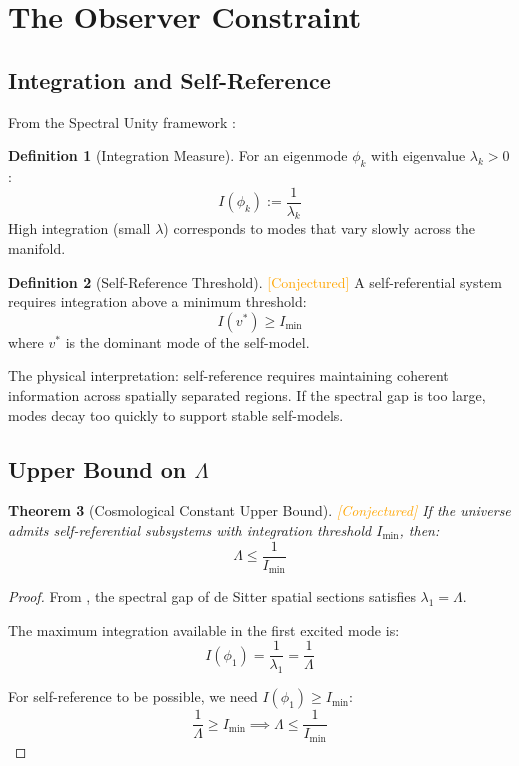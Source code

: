 \documentclass[11pt,a4paper]{article}
\theoremstyle{plain}
\newtheorem{theorem}{Theorem}[section]
\theoremstyle{definition}
\newtheorem{definition}[theorem]{Definition}
\theoremstyle{remark}
\newcommand{\conjectured}{\textcolor{orange}{[Conjectured]}}
\begin{document}
\section{The Observer Constraint}

\subsection{Integration and Self-Reference}

From the Spectral Unity framework \cite{spectral_unity}:

\begin{definition}[Integration Measure]
For an eigenmode $\phi_k$ with eigenvalue $\lambda_k > 0$:
\[
I(\phi_k) := \frac{1}{\lambda_k}
\]
High integration (small $\lambda$) corresponds to modes that vary slowly across the manifold.
\end{definition}

\begin{definition}[Self-Reference Threshold] \conjectured
\label{def:threshold}
A self-referential system requires integration above a minimum threshold:
\[
I(v^*) \geq I_{\min}
\]
where $v^*$ is the dominant mode of the self-model.
\end{definition}

The physical interpretation: self-reference requires maintaining coherent information across spatially separated regions. If the spectral gap is too large, modes decay too quickly to support stable self-models.

\subsection{Upper Bound on $\Lambda$}

\begin{theorem}[Cosmological Constant Upper Bound] \conjectured
\label{thm:upper_bound}
If the universe admits self-referential subsystems with integration threshold $I_{\min}$, then:
\[
\Lambda \leq \frac{1}{I_{\min}}
\]
\end{theorem}

\begin{proof}
From , the spectral gap of de Sitter spatial sections satisfies $\lambda_1 = \Lambda$.

The maximum integration available in the first excited mode is:
\[
I(\phi_1) = \frac{1}{\lambda_1} = \frac{1}{\Lambda}
\]

For self-reference to be possible, we need $I(\phi_1) \geq I_{\min}$:
\[
\frac{1}{\Lambda} \geq I_{\min} \implies \Lambda \leq \frac{1}{I_{\min}}
\]
\end{proof}
\end{document}

